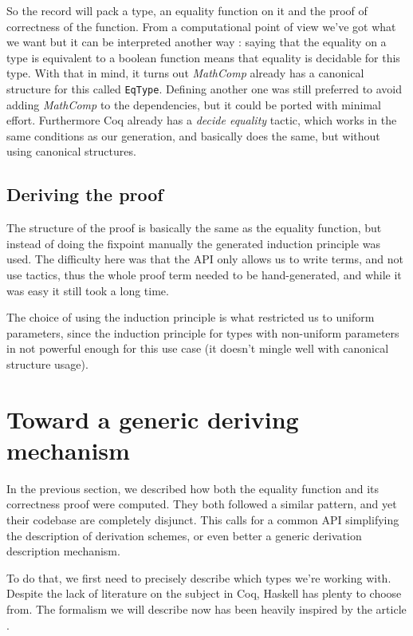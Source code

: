 \documentclass{article}
\begin{document}
So the record will pack a type, an equality function on it and the proof of
correctness of the function. From a computational point of view we've got what we
want but it can be interpreted another way : saying that the equality on a
type is equivalent to a boolean function means that equality is decidable for
this type. With that in mind, it turns out \emph{MathComp} already has a
canonical structure for this called \texttt{EqType}. Defining another one was
still preferred to avoid adding \emph{MathComp} to the dependencies, but it
could be ported with minimal effort. Furthermore Coq already has a
\emph{decide equality} tactic, which works in the same conditions as our
generation, and basically does the same, but without using canonical structures.

\subsection{Deriving the proof}

The structure of the proof is basically the same as the equality function, but
instead of doing the fixpoint manually the generated induction principle was
used. The difficulty here was that the API only allows us to write terms, and
not use tactics, thus the whole proof term needed to be hand-generated, and
while it was easy it still took a long time.

The choice of using the induction principle is what restricted us to uniform
parameters, since the induction principle for types with non-uniform parameters
in not powerful enough for this use case (it doesn't mingle well with canonical
structure usage).

\section{Toward a generic deriving mechanism}\label{gender}

In the previous section, we described how both the equality function and its
correctness proof were computed. They both followed a similar pattern, and
yet their codebase are completely disjunct. This calls for a common API
simplifying the description of derivation schemes, or even better a generic
derivation description mechanism.

To do that, we first need to precisely describe which types we're working with.
Despite the lack of literature on the subject in Coq, Haskell has plenty to
choose from. The formalism we will describe now has been heavily inspired by
the article \cite{genDep}.
\end{document}
